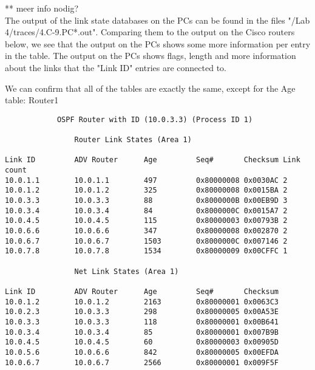 ** meer info nodig? \\
The output of the link state databases on the PCs can be found in the files "/Lab 4/traces/4.C-9.PC*.out". Comparing them to the output on the Cisco routers below, we see that the output on the PCs shows some more information per entry in the table. The output on the PCs shows flags, length and more information about the links that the "Link ID" entries are connected to.

We can confirm that all of the tables are exactly the same, except for the Age table:
Router1
\begin{lstlisting}
            OSPF Router with ID (10.0.3.3) (Process ID 1)

                Router Link States (Area 1)

Link ID         ADV Router      Age         Seq#       Checksum Link count
10.0.1.1        10.0.1.1        497         0x80000008 0x0030AC 2
10.0.1.2        10.0.1.2        325         0x80000008 0x0015BA 2
10.0.3.3        10.0.3.3        88          0x8000000B 0x00EB9D 3
10.0.3.4        10.0.3.4        84          0x8000000C 0x0015A7 2
10.0.4.5        10.0.4.5        115         0x80000003 0x00793B 2
10.0.6.6        10.0.6.6        347         0x80000008 0x002870 2
10.0.6.7        10.0.6.7        1503        0x8000000C 0x007146 2
10.0.7.8        10.0.7.8        1534        0x80000009 0x00CFFC 1

                Net Link States (Area 1)

Link ID         ADV Router      Age         Seq#       Checksum
10.0.1.2        10.0.1.2        2163        0x80000001 0x0063C3
10.0.2.3        10.0.3.3        298         0x80000005 0x00A53E
10.0.3.3        10.0.3.3        118         0x80000001 0x00B641
10.0.3.4        10.0.3.4        85          0x80000001 0x007B9B
10.0.4.5        10.0.4.5        60          0x80000003 0x00905D
10.0.5.6        10.0.6.6        842         0x80000005 0x00EFDA
10.0.6.7        10.0.6.7        2566        0x80000001 0x009F5F
\end{lstlisting}

